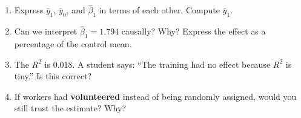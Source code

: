 \documentclass[11pt,a4paper]{article}
\begin{document}
\begin{enumerate}[label=(\alph*)]
\item Express $\bar{y}_1$, $\bar{y}_0$, and $\hat{\beta}_1$ in terms of each other. Compute $\bar{y}_1$.

\begin{answerbox}
\vspace{3.5cm}
\end{answerbox}

\item Can we interpret $\hat{\beta}_1 = 1.794$ causally? Why? Express the effect as a percentage of the control mean.

\begin{answerbox}
\vspace{3.5cm}
\end{answerbox}

\item The $R^2$ is 0.018. A student says: ``The training had no effect because $R^2$ is tiny.'' Is this correct?

\begin{answerbox}
\vspace{3.5cm}
\end{answerbox}

\item If workers had \textbf{volunteered} instead of being randomly assigned, would you still trust the estimate? Why?

\begin{answerbox}
\vspace{3.5cm}
\end{answerbox}
\end{enumerate}
\end{document}
